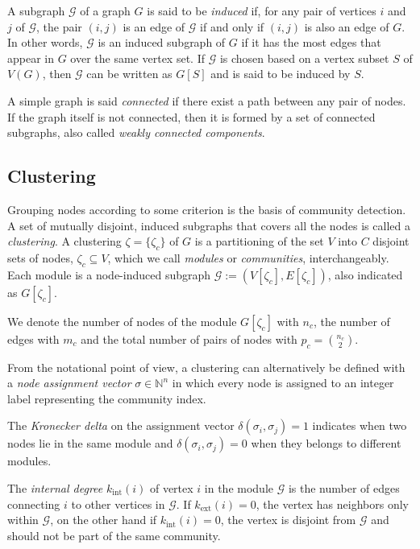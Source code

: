 A subgraph $\mathcal{G}$ of a graph $G$ is said to be \emph{induced} if, for any pair of vertices $i$ and $j$ of $\mathcal{G}$, the pair $(i,j)$ is an edge of $\mathcal{G}$ if and only if $(i,j)$ is also an edge of $G$. In other words, $\mathcal{G}$ is an induced subgraph of $G$ if it has the most edges that appear in $G$ over the same vertex set. If $\mathcal{G}$ is chosen based on a vertex subset $S$ of $V(G)$, then $\mathcal{G}$ can be written as $G[S]$ and is said to be induced by $S$.

A simple graph is said \emph{connected} if there exist a path between any pair of nodes. If the graph itself is not connected, then it is formed by a set of connected subgraphs, also called \emph{weakly connected components}.

\subsection{Clustering}\label{sec:clustering}
Grouping nodes according to some criterion is the basis of community detection. 
A set of mutually disjoint, induced subgraphs that covers all the nodes is called a \emph{clustering}.
A clustering $\zeta = \{\zeta_c\}$ of $G$ is a partitioning of the set $V$ into $C$ disjoint sets of nodes, $\zeta_c \subseteq V$, which we call \emph{modules} or \emph{communities}, interchangeably. 
Each module is a node-induced subgraph $\mathcal{G}:=(V[\zeta_c],E[\zeta_c])$, also indicated as $G[\zeta_c]$.

We denote the number of nodes of the module $G[\zeta_c]$ with $n_c$, the number of edges with $m_c$ and the total number of pairs of nodes with $p_c=\binom{n_c}{2}$.

From the notational point of view, a clustering can alternatively be defined with a \emph{node assignment vector} $\sigma \in \mathbb{N}^n$ in which every node is assigned to an integer label representing the community index. 

The \emph{Kronecker delta} on the assignment vector $\delta(\sigma_i,\sigma_j)=1$ indicates when two nodes lie in the same module and $\delta(\sigma_i,\sigma_j)=0$ when they belongs to different modules.

The \emph{internal degree} $k_{\textrm{int}}(i)$ of vertex $i$ in the module $\mathcal{G}$ is the number of edges connecting $i$ to other vertices in $\mathcal{G}$. If $k_{\textrm{ext}}(i)=0$, the vertex has neighbors only within $\mathcal{G}$, on the other hand if $k_{\textrm{int}}(i)=0$, the vertex is disjoint from $\mathcal{G}$ and should not be part of the same community.

